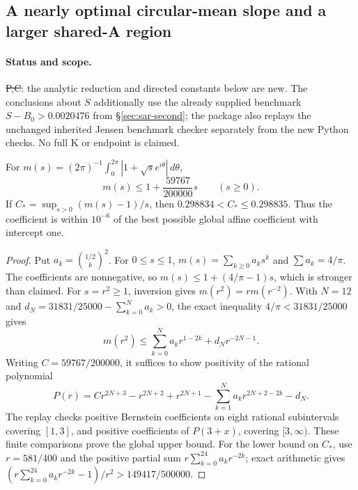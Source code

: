 \subsection{A nearly optimal circular-mean slope and a larger shared-A region}
\label{sec:sharp-circular-audit}
\paragraph{Status and scope.}
\st{P,C}: the analytic reduction and directed constants below are new.
The conclusions about $S$ additionally use the already supplied benchmark
$S-B_0>0.0020476$ from \S\ref{sec:sar-second}; the package also replays the unchanged inherited Jensen benchmark
checker separately from the new Python checks. No full K or endpoint is claimed.

\begin{theorem}\label{thm:sharp-circular-audit}
For $m(s)=(2\pi)^{-1}\int_0^{2\pi}|1+\sqrt{s}e^{i\theta}|\,d\theta$,
\[
 m(s)\le1+\frac{59767}{200000}s\qquad(s\ge0).
\]
If $C_* =\sup_{s>0}(m(s)-1)/s$, then
$0.298834<C_*\le0.298835$. Thus the coefficient is within $10^{-6}$
of the best possible global affine coefficient with intercept one.
\end{theorem}
\begin{proof}
Put $a_k=\binom{1/2}{k}^2$. For $0\le s\le1$,
$m(s)=\sum_{k\ge0}a_ks^k$ and $\sum a_k=4/\pi$.
The coefficients are nonnegative, so
$m(s)\le1+(4/\pi-1)s$, which is stronger than claimed.
For $s=r^2\ge1$, inversion gives $m(r^2)=r m(r^{-2})$.
With $N=12$ and
$d_N=31831/25000-\sum_{k=0}^N a_k>0$, the exact inequality
$4/\pi<31831/25000$ gives
\[
 m(r^2)\le\sum_{k=0}^N a_k r^{1-2k}+d_Nr^{-2N-1}.
\]
Writing $C=59767/200000$, it suffices to show positivity of the rational
polynomial
\[
 P(r)=Cr^{2N+3}-r^{2N+2}+r^{2N+1}
       -\sum_{k=1}^N a_kr^{2N+2-2k}-d_N.
\]
The replay checks positive Bernstein coefficients on eight rational
subintervals covering $[1,3]$, and positive coefficients of $P(3+x)$,
covering $[3,\infty)$. These finite comparisons prove the global upper
bound. For the lower bound on $C_*$, use $r=581/400$ and the positive
partial sum $r\sum_{k=0}^{24}a_kr^{-2k}$; exact arithmetic gives
$(r\sum_{k=0}^{24}a_kr^{-2k}-1)/r^2>149417/500000$.
\end{proof}

